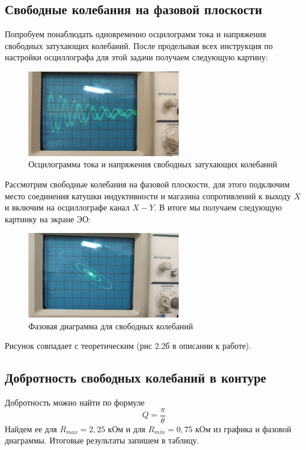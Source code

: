 \documentclass[a4paper, 12pt]{article}%
\begin{document}
\newpage
\subsection{Свободные колебания на фазовой плоскости}
Попробуем понаблюдать одновременно осцилограмм тока и напряжения свободных затухающих колебаний. После проделывая всех инструкция по настройки осциллографа для этой задачи получаем следующую картину:


\begin{figure}[h!]
\begin{center}
\includegraphics[width = 0.6\textwidth]{my2.jpg}
\caption{Осцилограмма тока и напряжения свободных затухающих колебаний}
\end{center}
\end{figure}


Рассмотрим свободные колебания на фазовой плоскости, для этого подключим место соединения катушки индуктивности и магазина сопротивлений к выходу $X$ и включим на осциллографе канал $X-Y$. В итоге мы получаем следующую картинку на экране ЭО:

\begin{figure}[h!]
\begin{center}
\includegraphics[width = 0.6\textwidth]{my3.jpg}
\caption{Фазовая диаграмма для свободных колебаний}
\end{center}
\end{figure}

Рисунок совпадает с теоретическим (рис 2.2б в описании к работе).



\subsection{Добротность свободных колебаний в контуре}
Добротность можно найти по формуле 
\[Q = \dfrac{\pi}{\theta}\]
Найдем ее для $R_{max} = 2,25$ кОм и для $R_{min} = 0,75$ кОм из графика и фазовой диаграммы. Итоговые результаты запишем в таблицу.
\end{document}

